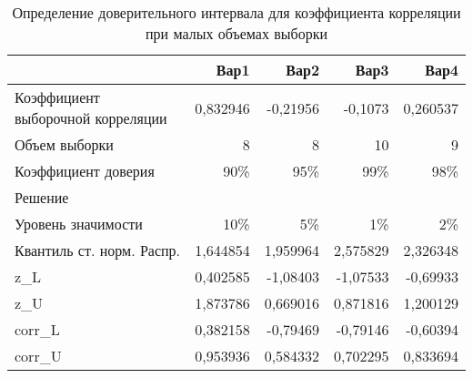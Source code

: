 \documentclass[12pt,a4paper]{article}
\begin{document}
\begin{taskrus}
\begin{table}[H]
  \centering
  \caption{Определение доверительного интервала для коэффициента корреляции при малых объемах выборки}
    \begin{tabular}{lrrrr}
    \toprule
          & Вар1  & Вар2  & Вар3  & Вар4 \\
    \midrule
    Коэффициент выборочной корреляции & 0,832946 & -0,21956 & -0,1073 & 0,260537 \\
    Объем выборки & 8     & 8     & 10    & 9 \\
    Коэффициент доверия & 90\%  & 95\%  & 99\%  & 98\% \\
    Решение &       &       &       &  \\
    Уровень значимости & 10\%  & 5\%   & 1\%   & 2\% \\
    Квантиль ст. норм. Распр. & 1,644854 & 1,959964 & 2,575829 & 2,326348 \\
    z\_L  & 0,402585 & -1,08403 & -1,07533 & -0,69933 \\
    z\_U  & 1,873786 & 0,669016 & 0,871816 & 1,200129 \\
    corr\_L & 0,382158 & -0,79469 & -0,79146 & -0,60394 \\
    corr\_U & 0,953936 & 0,584332 & 0,702295 & 0,833694 \\
    \bottomrule
    \end{tabular}%
  \label{tab:addlabel}%
\end{table}%


\end{taskrus}
\end{document}
